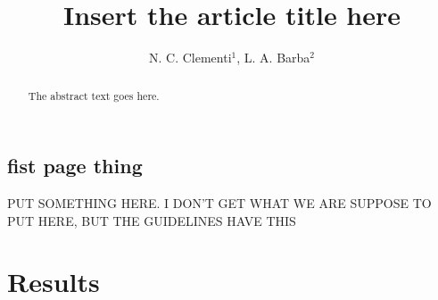 \documentclass[openacc]{rstransa} %
\begin{document}
\title{Insert the article title here}

\author{%
N. C. Clementi$^{1}$, L. A. Barba$^{2}$}

\address{$^{1}$First author address\\
$^{2}$Second author address\\
$^{3}$Third author address}

\subject{xxxxx, xxxxx, xxxx}



\begin{abstract}
    The abstract text goes here. 
\end{abstract}
    
    
\begin{fmtext}  
\section{fist page thing}

PUT SOMETHING HERE. I DON'T GET WHAT WE ARE SUPPOSE TO PUT HERE, BUT THE GUIDELINES HAVE THIS

\end{fmtext}

\maketitle

\section{Results} \label{sec:results}



\end{document}
